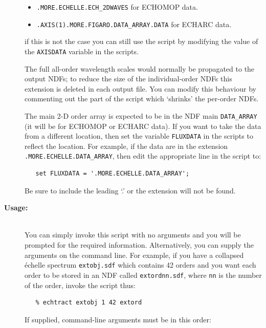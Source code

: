 \documentclass[twoside,11pt]{article}
\renewcommand{\_}{\texttt{\symbol{95}}}
\begin{document}
\begin{description}
\begin{itemize}
\item \verb+.MORE.ECHELLE.ECH_2DWAVES+ for ECHOMOP data.

\item \verb+.AXIS(1).MORE.FIGARO.DATA_ARRAY.DATA+ for ECHARC data.

\end{itemize}

     if this is not the case you can still use the script by modifying
     the value of the \verb+AXISDATA+ variable in the scripts.

     The full all-order wavelength scales
     would normally be propagated to the output NDFs; to reduce the
     size of the individual-order NDFs this extension is deleted in each
     output file.  You can modify this behaviour by commenting out the
     part of the script which `shrinks' the per-order NDFs.

     The main 2-D order array is expected to be in the NDF main
     \verb+DATA_ARRAY+ (it will be for ECHOMOP or ECHARC data).
     If you want to take the data from a different location, then
     set the variable \verb+FLUXDATA+ in the scripts to reflect
     the location.  For example, if the data are in the extension
     \verb+.MORE.ECHELLE.DATA_ARRAY+, then edit the appropriate line
     in the script to:

\begin{verbatim}
   set FLUXDATA = '.MORE.ECHELLE.DATA_ARRAY';
\end{verbatim}

     Be sure to include the leading `.' or the extension will not be
     found.

\item [{\bf Usage:}] \mbox{} \\
     You can simply invoke this script with no arguments and you
     will be prompted for the required information.  Alternatively,
     you can supply the arguments on the command line.  For example,
     if you have a collapsed \'{e}chelle spectrum \verb+extobj.sdf+ which
     contains 42 orders and you want each order to be stored in an NDF
     called {\tt extord\_nn.sdf}, where \verb+nn+ is the number of the
     order, invoke the script thus:

\begin{verbatim}
   % echtract extobj 1 42 extord
\end{verbatim}

     If supplied, command-line arguments must be in this order:

\begin{enumerate}


\end{enumerate}
\end{description}
\end{document}
